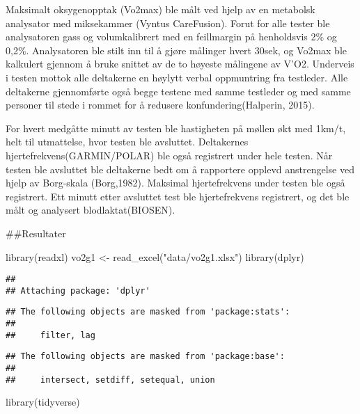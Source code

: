 \documentclass[
]{article}
\newenvironment{Shaded}{\begin{snugshade}}{\end{snugshade}}
\newcommand{\FunctionTok}[1]{\textcolor[rgb]{0.00,0.00,0.00}{#1}}
\newcommand{\NormalTok}[1]{#1}
\newcommand{\OtherTok}[1]{\textcolor[rgb]{0.56,0.35,0.01}{#1}}
\newcommand{\StringTok}[1]{\textcolor[rgb]{0.31,0.60,0.02}{#1}}
\begin{document}
Maksimalt oksygenopptak (Vo2max) ble målt ved hjelp av en metabolsk
analysator med miksekammer (Vyntus CareFusion). Forut for alle tester
ble analysatoren gass og volumkalibrert med en feillmargin på
henholdsvis 2\% og 0,2\%. Analysatoren ble stilt inn til å gjøre
målinger hvert 30sek, og Vo2max ble kalkulert gjennom å bruke snittet av
de to høyeste målingene av V'O2. Underveis i testen mottok alle
deltakerne en høylytt verbal oppmuntring fra testleder. Alle deltakerne
gjennomførte også begge testene med samme testleder og med samme
personer til stede i rommet for å redusere konfundering(Halperin, 2015).

For hvert medgåtte minutt av testen ble hastigheten på møllen økt med
1km/t, helt til utmattelse, hvor testen ble avsluttet. Deltakernes
hjertefrekvens(GARMIN/POLAR) ble også registrert under hele testen. Når
testen ble avsluttet ble deltakerne bedt om å rapportere opplevd
anstrengelse ved hjelp av Borg-skala (Borg,1982). Maksimal
hjertefrekvens under testen ble også registrert. Ett minutt etter
avsluttet test ble hjertefrekvens registrert, og det ble målt og
analysert blodlaktat(BIOSEN).

\#\#Resultater

\begin{Shaded}
\begin{Highlighting}[]
\FunctionTok{library}\NormalTok{(readxl)}
\NormalTok{vo2g1 }\OtherTok{\textless{}{-}} \FunctionTok{read\_excel}\NormalTok{(}\StringTok{"data/vo2g1.xlsx"}\NormalTok{)}
\FunctionTok{library}\NormalTok{(dplyr)}
\end{Highlighting}
\end{Shaded}

\begin{verbatim}
## 
## Attaching package: 'dplyr'
\end{verbatim}

\begin{verbatim}
## The following objects are masked from 'package:stats':
## 
##     filter, lag
\end{verbatim}

\begin{verbatim}
## The following objects are masked from 'package:base':
## 
##     intersect, setdiff, setequal, union
\end{verbatim}

\begin{Shaded}
\begin{Highlighting}[]
\FunctionTok{library}\NormalTok{(tidyverse)}
\end{Highlighting}
\end{Shaded}
\end{document}

